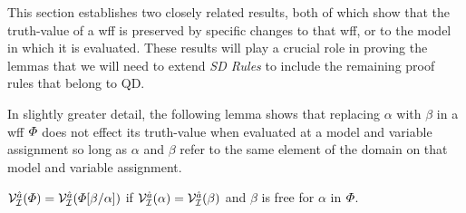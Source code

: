 This section establishes two closely related results, both of which show that the truth-value of a wff is preserved by specific changes to that wff, or to the model in which it is evaluated.
These results will play a crucial role in proving the lemmas that we will need to extend \textit{SD Rules} to include the remaining proof rules that belong to QD.

In slightly greater detail, the following lemma shows that replacing $\alpha$ with $\beta$ in a wff $\varPhi$ does not effect its truth-value when evaluated at a model and variable assignment so long as $\alpha$ and $\beta$ refer to the same element of the domain on that model and variable assignment.

\begin{Lthm} \label{lemma:sub}
  $\mathcal{V}_{\mathcal{I}}^{\hat{a}}(\varPhi)=\mathcal{V}_{\mathcal{I}}^{\hat{a}}(\varPhi[\beta/\alpha])$ if $\mathcal{V}_{\mathcal{I}}^{\hat{a}}(\alpha)=\mathcal{V}_{\mathcal{I}}^{\hat{a}}(\beta)$ and $\beta$ is free for $\alpha$ in $\varPhi$.
\end{Lthm}

